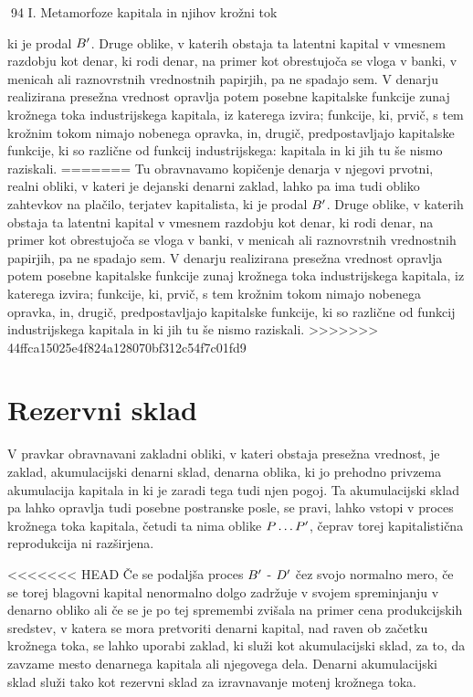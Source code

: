 \documentclass[kapital_02.tex]{subfiles}
\begin{document}
94 I. Metamorfoze kapitala in njihov krožni tok



 ki je prodal \( B' \). Druge oblike, v katerih obstaja ta latentni kapital v vmesnem razdobju kot denar, ki rodi denar, na primer kot obrestujoča se vloga v banki, v menicah ali raznovrstnih vrednostnih papirjih, pa ne spadajo sem. V denarju realizirana presežna vrednost opravlja potem posebne kapitalske funkcije zunaj krožnega toka industrijskega kapitala, iz katerega izvira; funkcije, ki, prvič, s tem krožnim tokom nimajo nobenega opravka, in, drugič, predpostavljajo kapitalske funkcije, ki so različne od funkcij industrijskega: kapitala in ki jih tu še nismo raziskali.
=======
Tu obravnavamo kopičenje denarja v njegovi prvotni, realni obliki, v kateri je dejanski denarni zaklad, lahko pa ima tudi obliko zahtevkov na plačilo, terjatev kapitalista, ki \KPEstran je prodal \( B' \). Druge oblike, v katerih obstaja ta latentni kapital v vmesnem razdobju kot denar, ki rodi denar, na primer kot obrestujoča se vloga v banki, v menicah ali raznovrstnih vrednostnih papirjih, pa ne spadajo sem. V denarju realizirana presežna vrednost opravlja potem posebne kapitalske funkcije zunaj krožnega toka industrijskega kapitala, iz katerega izvira; funkcije, ki, prvič, s tem krožnim tokom nimajo nobenega opravka, in, drugič, predpostavljajo kapitalske funkcije, ki so različne od funkcij industrijskega kapitala in ki jih tu še nismo raziskali.
>>>>>>> 44ffca15025e4f824a128070bf312c54f7c01fd9

\section{Rezervni sklad}

V pravkar obravnavani zakladni obliki, v kateri obstaja presežna vrednost, je zaklad, akumulacijski denarni sklad, denarna oblika, ki jo prehodno privzema akumulacija kapitala in ki je zaradi tega tudi njen pogoj. Ta akumulacijski sklad pa lahko opravlja tudi posebne postranske posle, se pravi, lahko vstopi v proces krožnega toka kapitala, četudi ta nima oblike \( P \dots P' \), čeprav torej kapitalistična reprodukcija ni razširjena.

<<<<<<< HEAD
Če se podaljša proces \( B' \) - \( D' \) čez svojo normalno mero, če se torej blagovni kapital nenormalno dolgo zadržuje v svojem spreminjanju v denarno obliko ali če se je po tej spremembi zvišala na primer cena produkcijskih sredstev, v katera se mora pretvoriti denarni kapital, nad raven ob začetku krožnega toka, se lahko uporabi zaklad, ki služi kot akumulacijski sklad, za to, da zavzame mesto denarnega kapitala ali njegovega dela. Denarni akumulacijski sklad služi tako kot rezervni sklad za izravnavanje motenj krožnega toka.
\end{document}
